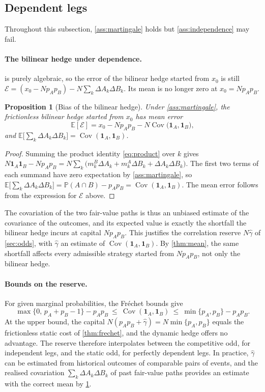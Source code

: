 \documentclass[11pt,a4paper]{article}
\theoremstyle{plain}
\newtheorem{proposition}[theorem]{Proposition}
\theoremstyle{definition}
\theoremstyle{remark}
\newcommand{\E}{\mathbb{E}}
\newcommand{\Prob}{\mathbb{P}}
\newcommand{\1}{\mathbf{1}}
\newcommand{\Cov}{\operatorname{Cov}}
\begin{document}
\subsection{Dependent legs}

Throughout this subsection, \cref{ass:martingale} holds but \cref{ass:independence} may fail.

\paragraph{The bilinear hedge under dependence.}
 is purely algebraic, so the error of the bilinear hedge started from $x_0$ is still $\mathcal{E} = (x_0 - Np_Ap_B) - N\sum_k\Delta A_k\Delta B_k$. Its mean is no longer zero at $x_0=Np_Ap_B$.

\begin{proposition}[Bias of the bilinear hedge]
\label{prop:bias}
Under \cref{ass:martingale}, the frictionless bilinear hedge started from $x_0$ has mean error
\[
\E[\mathcal{E}] = x_0 - Np_Ap_B - N\Cov\bigl(\1_A,\1_B\bigr),
\]
and $\E\bigl[\sum_k\Delta A_k\Delta B_k\bigr] = \Cov(\1_A,\1_B)$.
\end{proposition}

\begin{proof}
Summing the product identity \eqref{eq:product} over $k$ gives $N\1_A\1_B - Np_Ap_B = N\sum_k\bigl(m^B_k\Delta A_k + m^A_k\Delta B_k + \Delta A_k\Delta B_k\bigr)$. The first two terms of each summand have zero expectation by \cref{ass:martingale}, so $\E\bigl[\sum_k\Delta A_k\Delta B_k\bigr] = \Prob(A\cap B) - p_Ap_B = \Cov(\1_A,\1_B)$. The mean error follows from the expression for $\mathcal{E}$ above.
\end{proof}

The covariation of the two fair-value paths is thus an unbiased estimate of the covariance of the outcomes, and its expected value is exactly the shortfall the bilinear hedge incurs at capital $Np_Ap_B$. This justifies the correlation reserve $N\hat\gamma$ of \cref{sec:odds}, with $\hat\gamma$ an estimate of $\Cov(\1_A,\1_B)$. By \cref{thm:mean}, the same shortfall affects every admissible strategy started from $Np_Ap_B$, not only the bilinear hedge.

\paragraph{Bounds on the reserve.}
For given marginal probabilities, the Fréchet bounds give
\[
\max\{0,\,p_A+p_B-1\} - p_Ap_B\ \leq\ \Cov(\1_A,\1_B)\ \leq\ \min\{p_A,p_B\} - p_Ap_B.
\]
At the upper bound, the capital $N(p_Ap_B + \hat\gamma) = N\min\{p_A,p_B\}$ equals the frictionless static cost of \cref{thm:frechet}, and the dynamic hedge offers no advantage. The reserve therefore interpolates between the competitive odd, for independent legs, and the static odd, for perfectly dependent legs. In practice, $\hat\gamma$ can be estimated from historical outcomes of comparable pairs of events, and the realised covariation $\sum_k\Delta A_k\Delta B_k$ of past fair-value paths provides an estimate with the correct mean by \cref{prop:bias}.
\end{document}
